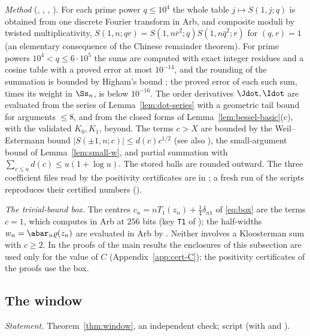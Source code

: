 \emph{Method} (, , ,
). For each prime power $q\le10^4$ the whole table $j\mapsto S(1,j;q)$ is obtained from one discrete Fourier
transform in Arb, and composite moduli by twisted multiplicativity, $S(1,n;qr)=S(1,n\bar r^2;q)S(1,n\bar q^2;r)$ for $(q,r)=1$ (an elementary consequence of the Chinese
remainder theorem). For prime powers $10^4<q\le6\cdot10^5$ the sums are computed with exact integer residues and a cosine table with a proved
error at most $10^{-14}$, and the rounding of the summation is bounded by Higham's bound \cite{Hig02}; the proved error of each such sum, times its weight in
$\Ss_n$, is below $10^{-16}$. The order derivatives $\Jdot,\Idot$ are evaluated from the series of Lemma~\ref{lem:dot-series} with a geometric
tail bound for arguments $\le8$, and from the closed forms of Lemma~\ref{lem:bessel-basic}(c), with the validated $K_0,K_1$, beyond. The terms
$c>X$ are bounded by the Weil--Estermann bound $|S(\pm1,n;c)|\le d(c)c^{1/2}$ \cite{Wei48,Est61} (see also \cite[Chapter~11]{IK04}), the small-argument
bound of Lemma~\ref{lem:small-w}, and partial summation with $\sum_{c\le u}d(c)\le u(1+\log u)$. The stored balls are rounded outward. The
three coefficient files read by the positivity certificates are in ; a fresh run of the scripts reproduces their
certified numbers ().

\emph{The trivial-bound box.} The centres $c_n=nT_1(z_n)+\frac14\delta_{n1}$ of \eqref{eq:box} are the terms $c=1$, which 
computes in Arb at $256$ bits (key \texttt{T1} of ); the half-widths $w_n=\abar_n\varrho(z_n)$ are evaluated in
Arb by . Neither involves a Kloosterman sum with $c\ge2$. In the proofs of the main results the enclosures of this
subsection are used only for the value of $C$ (Appendix~\ref{app:cert-C}); the positivity certificates of the proofs use the box.

\subsection{The window}\label{app:cert-W}

\emph{Statement.} Theorem~\ref{thm:window}, an independent check; script  (with  and
).

